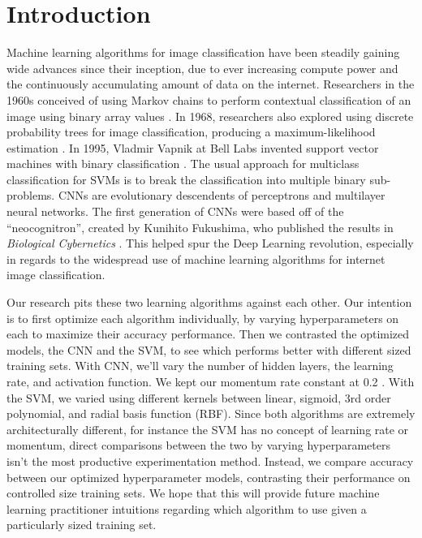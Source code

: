 \documentclass[12pt]{article}
\begin{document}
\section{Introduction}

Machine learning algorithms for image classification have been steadily gaining wide advances since their inception, due to ever increasing compute power and the continuously accumulating amount of data on the internet. Researchers in the 1960s conceived of using Markov chains to perform contextual classification of an image using binary array values \cite{1053827}. In 1968, researchers also explored using discrete probability trees for image classification, producing a maximum-likelihood estimation \cite{chow1968approximating}. In 1995, Vladmir Vapnik at Bell Labs invented support vector machines with binary classification \cite{cortes1995support}. The usual approach for multiclass classification for SVMs is to break the classification into multiple binary sub-problems. CNNs are evolutionary descendents of perceptrons and multilayer neural networks. The first generation of CNNs were based off of the “neocognitron”, created by Kunihito Fukushima, who published the results in \textit{Biological Cybernetics} \cite{fukushima1982neocognitron}. This helped spur the Deep Learning revolution, especially in regards to the widespread use of machine learning algorithms for internet image classification.

Our research pits these two learning algorithms against each other. Our intention is to first optimize each algorithm individually, by varying hyperparameters on each to maximize their accuracy performance. Then we contrasted the optimized models, the CNN and the SVM, to see which performs better with different sized training sets. With CNN, we’ll vary the number of hidden layers, the learning rate, and activation function. We kept our momentum rate constant at 0.2 . With the SVM, we varied using different kernels between linear, sigmoid, 3rd order polynomial, and radial basis function (RBF). Since both algorithms are extremely architecturally different, for instance the SVM has no concept of learning rate or momentum, direct comparisons between the two by varying hyperparameters isn’t the most productive experimentation method. Instead, we compare accuracy between our optimized hyperparameter models, contrasting their performance on controlled size training sets. We hope that this will provide future machine learning practitioner intuitions regarding which algorithm to use given a particularly sized training set.
\end{document}
